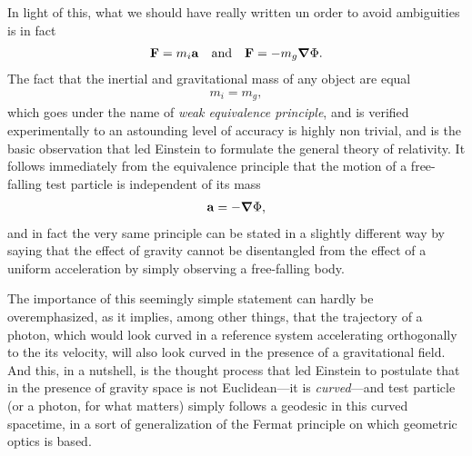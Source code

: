 In light of this, what we should have really written un order to avoid ambiguities
is in fact
\begin{align*}
  \vb{F} = m_i\vb{a} \quad \text{and} \quad \vb{F} = -m_g\grad{\Phi}.
\end{align*}
The fact that the inertial and gravitational mass of any object are equal
\begin{align}
  m_i = m_g,
\end{align}
which goes under the name of \emph{weak equivalence principle}, and is verified
experimentally to an astounding level of accuracy is highly non trivial, and is the
basic observation that led Einstein to formulate the general theory of relativity.
It follows immediately from the equivalence principle that the motion of a free-falling
test particle is independent of its mass
\begin{align}
  \vb{a} = -\grad{\Phi},
\end{align}
and in fact the very same principle can be stated in a slightly different way by
saying that the effect of gravity cannot be disentangled from the effect of a uniform
acceleration by simply
observing a free-falling body.


The importance of this seemingly simple statement can hardly be overemphasized, as
it implies, among other things, that the trajectory of a photon, which would look
curved in a reference system accelerating orthogonally to the its velocity, will
also look curved in the presence of a gravitational field. And this, in a nutshell,
is the thought process that led Einstein to postulate that in the presence of gravity
space is not Euclidean---it is \emph{curved}---and test particle (or a photon, for
what matters) simply follows a geodesic in this curved spacetime, in a sort of
generalization of the Fermat principle on which geometric optics is based.


